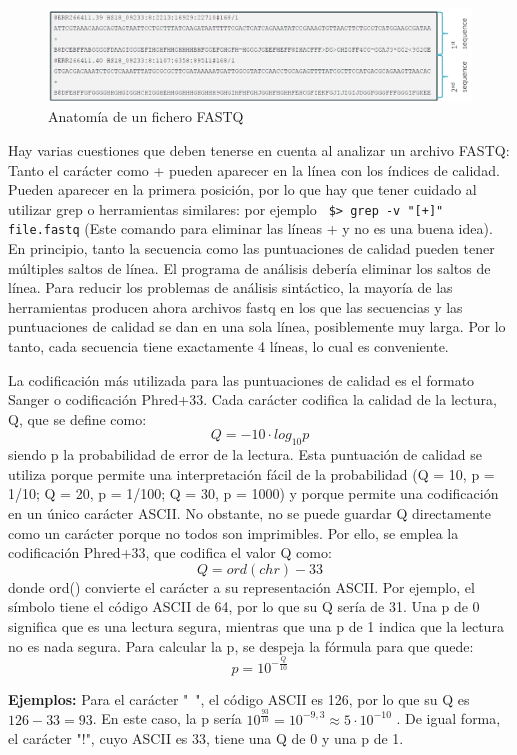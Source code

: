 \begin{figure}[htbp]
\centering
\includegraphics[width = \textwidth]{figs/fastq.png}
\caption{Anatomía de un fichero FASTQ}
\label{fig:fastq}
\end{figure}

Hay varias cuestiones que deben tenerse en cuenta al analizar un archivo FASTQ: Tanto el carácter \@ como + pueden aparecer en la línea con los índices de calidad. Pueden aparecer en la primera posición, por lo que hay que tener cuidado al utilizar grep o herramientas similares: por ejemplo \texttt{ \$> grep -v "[\@ +]" file.fastq} (Este comando para eliminar las líneas + y \@ no es una buena idea). En principio, tanto la secuencia como las puntuaciones de calidad pueden tener múltiples saltos de línea. El programa de análisis debería eliminar los saltos de línea. Para reducir los problemas de análisis sintáctico, la mayoría de las herramientas producen ahora archivos fastq en los que las secuencias y las puntuaciones de calidad se dan en una sola línea, posiblemente muy larga. Por lo tanto, cada secuencia tiene exactamente 4 líneas, lo cual es conveniente.

La codificación más utilizada para las puntuaciones de calidad es el formato Sanger o codificación Phred+33. Cada carácter codifica la calidad de la lectura, Q, que se define como:
$$Q = -10 \cdot log_{10} p$$
siendo p la probabilidad de error de la lectura. Esta puntuación de calidad se utiliza porque permite una interpretación fácil de la probabilidad (Q = 10, p = 1/10; Q = 20, p = 1/100; Q = 30, p = 1000) y porque permite una codificación en un único carácter ASCII. No obstante, no se puede guardar Q directamente como un carácter porque no todos son imprimibles. Por ello, se emplea la codificación Phred+33, que codifica el valor Q como:
$$Q = ord(chr) - 33$$
donde ord() convierte el carácter a su representación ASCII. Por ejemplo, el símbolo \@ tiene el código ASCII de 64, por lo que su Q sería de 31. Una p de 0 significa que es una lectura segura, mientras que una p de 1 indica que la lectura no es nada segura. Para calcular la p, se despeja la fórmula para que quede:
$$ p = 10^{-\frac{Q}{10}}$$

\textbf{Ejemplos:}
Para el carácter "~", el código ASCII es 126, por lo que su Q es $126-33 = 93$. En este caso, la p sería $10^{\frac{93}{10}} = 10^{-9,3} \approx 5 \cdot 10^{-10}$ .  De igual forma, el carácter "!", cuyo ASCII es 33, tiene una Q de 0 y una p de 1. 

